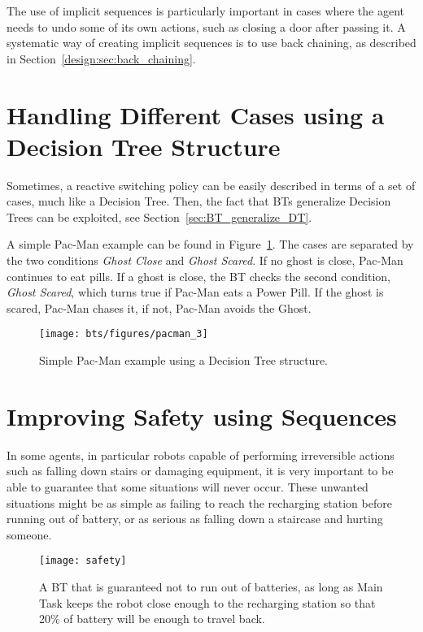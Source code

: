 The use of implicit sequences is particularly important in cases where the agent needs to undo some of its own actions, such as closing a door after passing it.
A systematic way of creating implicit sequences is to use back chaining, as described in Section~\ref{design:sec:back_chaining}.

\section{Handling Different Cases using a Decision Tree Structure}
\label{sec:dt}
Sometimes, a reactive switching policy can be easily described in terms of a set of cases, much like a Decision Tree.
Then, the fact that BTs generalize Decision Trees can be exploited, see Section~\ref{sec:BT_generalize_DT}.

A simple Pac-Man example can be found in Figure~\ref{design:fig:dt}. The cases are separated by the two conditions \emph{Ghost Close} and \emph{Ghost Scared}.
If no ghost is close, Pac-Man continues to eat pills. If a ghost is close, the BT checks the second condition, \emph{Ghost Scared}, which turns true if Pac-Man eats a Power Pill. If the ghost is scared, Pac-Man chases it, if not, Pac-Man avoids the Ghost.

\begin{figure}[h]
\centering
\texttt{[image: bts/figures/pacman\_3]}
\caption{Simple Pac-Man example using a Decision Tree structure.}
\label{design:fig:dt}
\end{figure}


\section{Improving Safety using Sequences}
\label{sec:safety}

In some agents, in particular robots capable of performing irreversible actions such as falling down stairs or damaging equipment, it is very important to be able to guarantee that some situations will never occur. These unwanted situations might be as simple as failing to reach the recharging station before running out of battery, or as serious as falling down a staircase and hurting someone.

\begin{figure}[h]
\centering
\texttt{[image: safety]}
\caption{A BT that is guaranteed not to run out of batteries, as long as Main Task keeps the robot close enough to the recharging station so that 20\% of battery will be enough to travel back.}
\label{design:fig:safety}
\end{figure}

